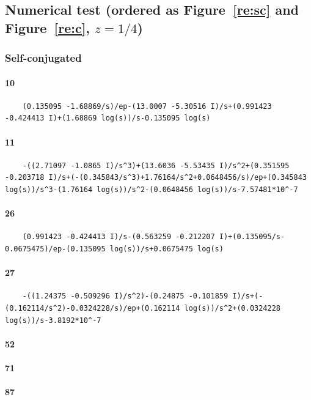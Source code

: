 \documentclass{article}
\begin{document}
\subsection{Numerical test (ordered as Figure~\ref{re:sc} and Figure~\ref{re:c}, $z=1/4$)}
\subsubsection{Self-conjugated}
\paragraph{10}
\begin{verbatim}
	(0.135095 -1.68869/s)/ep-(13.0007 -5.30516 I)/s+(0.991423 -0.424413 I)+(1.68869 log(s))/s-0.135095 log(s)
\end{verbatim}
\paragraph{11}
\begin{verbatim}
	-((2.71097 -1.0865 I)/s^3)+(13.6036 -5.53435 I)/s^2+(0.351595 -0.203718 I)/s+(-(0.345843/s^3)+1.76164/s^2+0.0648456/s)/ep+(0.345843 log(s))/s^3-(1.76164 log(s))/s^2-(0.0648456 log(s))/s-7.57481*10^-7
\end{verbatim}
\paragraph{26}
\begin{verbatim}
	(0.991423 -0.424413 I)/s-(0.563259 -0.212207 I)+(0.135095/s-0.0675475)/ep-(0.135095 log(s))/s+0.0675475 log(s)
\end{verbatim}
\paragraph{27}
\begin{verbatim}
	-((1.24375 -0.509296 I)/s^2)-(0.24875 -0.101859 I)/s+(-(0.162114/s^2)-0.0324228/s)/ep+(0.162114 log(s))/s^2+(0.0324228 log(s))/s-3.8192*10^-7
\end{verbatim}
\paragraph{52}
\paragraph{71}
\paragraph{87}
\end{document}
